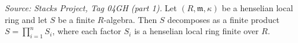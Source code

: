 \begin{lemma}
  \label{lem:henselian-finite-product-decomp}
  \textit{Source: Stacks Project, Tag 04GH (part 1).}
  Let $(R, \mathfrak{m}, \kappa)$ be a henselian local ring and let
  $S$ be a finite $R$-algebra. Then $S$ decomposes as a finite product
  $S = \prod_{i=1}^{n} S_{i}$, where each factor $S_{i}$ is a
  henselian local ring finite over $R$.
\end{lemma}

